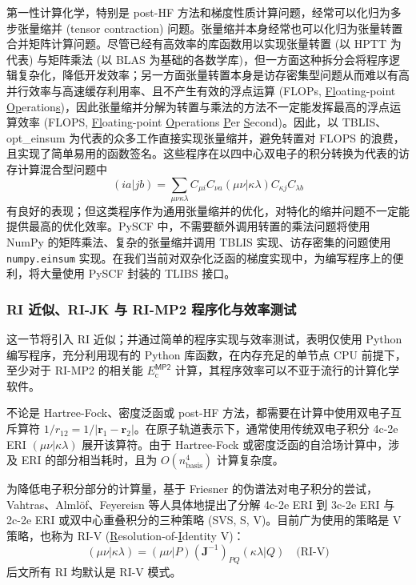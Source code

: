 第一性计算化学，特别是 post-HF 方法和梯度性质计算问题，经常可以化归为多步张量缩并 (tensor contraction) 问题。张量缩并本身经常也可以化归为张量转置合并矩阵计算问题。尽管已经有高效率的库函数用以实现张量转置 (以 HPTT 为代表) 与矩阵乘法 (以 BLAS 为基础的各数学库)，但一方面这种拆分会将程序逻辑复杂化，降低开发效率；另一方面张量转置本身是访存密集型问题从而难以有高并行效率与高速缓存利用率、且不产生有效的浮点运算 (FLOPs, \underline{Fl}oating-point \underline{Op}eration\underline{s})，因此张量缩并分解为转置与乘法的方法不一定能发挥最高的浮点运算效率 (FLOPS, \underline{Fl}oating-point \underline{O}perations \underline{P}er \underline{S}econd)。因此，以 TBLIS、opt\_einsum 为代表的众多工作直接实现张量缩并，避免转置对 FLOPS 的浪费，且实现了简单易用的函数签名。这些程序在以四中心双电子的积分转换为代表的访存计算混合型问题中
\begin{equation*}
  (ia|jb) = \sum_{\mu \nu \kappa \lambda} C_{\mu i} C_{\nu a} (\mu \nu | \kappa \lambda) C_{\kappa j} C_{\lambda b}
\end{equation*}
有良好的表现；但这类程序作为通用张量缩并的优化，对特化的缩并问题不一定能提供最高的优化效率。PySCF 中，不需要额外调用转置的乘法问题将使用 NumPy 的矩阵乘法、复杂的张量缩并调用 TBLIS 实现、访存密集的问题使用 \verb|numpy.einsum| 实现。在我们当前对双杂化泛函的梯度实现中，为编写程序上的便利，将大量使用 PySCF 封装的 TLIBS 接口。

\subsubsection{RI 近似、RI-JK 与 RI-MP2 程序化与效率测试}
\label{sec.rijk-rimp2-efficiency}

这一节将引入 RI 近似；并通过简单的程序实现与效率测试，表明仅使用 Python 编写程序，充分利用现有的 Python 库函数，在内存充足的单节点 CPU 前提下，至少对于 RI-MP2 的相关能 $E_\mathrm{c}^\textsf{MP2}$ 计算，其程序效率可以不亚于流行的计算化学软件。

不论是 Hartree-Fock、密度泛函或 post-HF 方法，都需要在计算中使用双电子互斥算符 $1 / r_{12} = 1 / |\bm{r}_1 - \bm{r}_2|$。在原子轨道表示下，通常使用传统双电子积分 4c-2e ERI $(\mu \nu | \kappa \lambda)$ 展开该算符。由于 Hartree-Fock 或密度泛函的自洽场计算中，涉及 ERI 的部分相当耗时，且为 $O(n_\mathrm{basis}^4)$ 计算复杂度。

为降低电子积分部分的计算量，基于 Friesner 的伪谱法对电子积分的尝试\cite{Friesner-Friesner.CPL.1985, Friesner-Friesner.JCP.1987}，Vahtras、Alml\"of、Feyereisn 等人具体地提出了分解 4c-2e ERI 到 3c-2e ERI 与 2c-2e ERI 或双中心重叠积分的三种策略 (SVS, S, V)\cite{Vahtras-Feyereisen.CPL.1993}。目前广为使用的策略是 V 策略，也称为 RI-V (\underline{R}esolution-of-\underline{I}dentity V)：
\begin{equation}
  (\mu \nu | \kappa \lambda) = (\mu \nu | P) (\mathbf{J}^{-1})_{PQ} (\kappa \lambda | Q) \quad \text{(RI-V)}
\end{equation}
后文所有 RI 均默认是 RI-V 模式。

